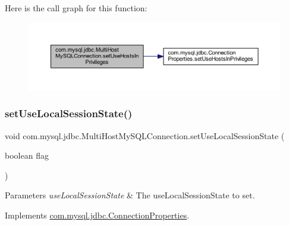 Here is the call graph for this function\+:
\nopagebreak
\begin{figure}[H]
\begin{center}
\leavevmode
\includegraphics[width=350pt]{classcom_1_1mysql_1_1jdbc_1_1_multi_host_my_s_q_l_connection_a4e5dd7ecb303ca181e108a90b5917445_cgraph}
\end{center}
\end{figure}
\mbox{\label{classcom_1_1mysql_1_1jdbc_1_1_multi_host_my_s_q_l_connection_a9c5be4608718622501934b5054995bf7}} 
\subsubsection{\texorpdfstring{set\+Use\+Local\+Session\+State()}{setUseLocalSessionState()}}
{\footnotesize\ttfamily void com.\+mysql.\+jdbc.\+Multi\+Host\+My\+S\+Q\+L\+Connection.\+set\+Use\+Local\+Session\+State (\begin{DoxyParamCaption}\item[{boolean}]{flag }\end{DoxyParamCaption})}


\begin{DoxyParams}{Parameters}
{\em use\+Local\+Session\+State} & The use\+Local\+Session\+State to set. \\
\hline
\end{DoxyParams}


Implements \mbox{\hyperlink{interfacecom_1_1mysql_1_1jdbc_1_1_connection_properties_a27a764e918cf2d90a6bbedec87ce6820}{com.\+mysql.\+jdbc.\+Connection\+Properties}}.


